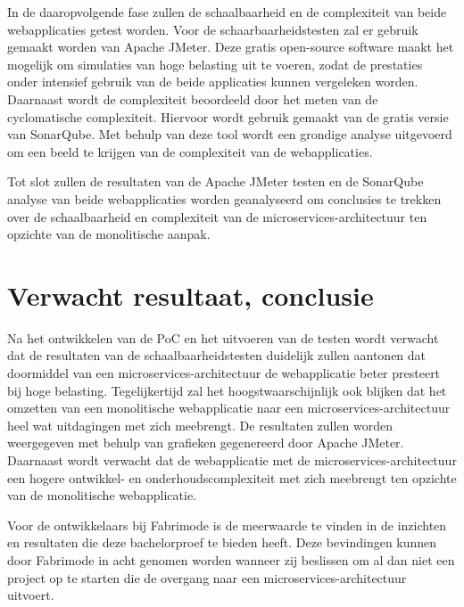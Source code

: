 In de daaropvolgende fase zullen de schaalbaarheid en de complexiteit van beide webapplicaties getest worden. Voor de schaarbaarheidstesten zal er gebruik gemaakt worden van Apache JMeter. Deze gratis open-source software maakt het mogelijk om simulaties van hoge belasting uit te voeren, zodat de prestaties onder intensief gebruik van de beide applicaties kunnen vergeleken worden. Daarnaast wordt de complexiteit beoordeeld door het meten van de cyclomatische complexiteit. Hiervoor wordt gebruik gemaakt van de gratis versie van SonarQube. Met behulp van deze tool wordt een grondige analyse uitgevoerd om een beeld te krijgen van de complexiteit van de webapplicaties.

Tot slot zullen de resultaten van de Apache JMeter testen en de SonarQube analyse van beide webapplicaties worden geanalyseerd om conclusies te trekken over de schaalbaarheid en complexiteit van de microservices-architectuur ten opzichte van de monolitische aanpak.

\section{Verwacht resultaat, conclusie}%
\label{sec:verwachte_resultaten}

Na het ontwikkelen van de PoC en het uitvoeren van de testen wordt verwacht dat de resultaten van de schaalbaarheidstesten duidelijk zullen aantonen dat doormiddel van een microservices-architectuur de webapplicatie beter presteert bij hoge belasting. Tegelijkertijd zal het hoogstwaarschijnlijk ook blijken dat het omzetten van een monolitische webapplicatie naar een microservices-architectuur heel wat uitdagingen met zich meebrengt. De resultaten zullen worden weergegeven met behulp van grafieken gegenereerd door Apache JMeter. Daarnaast wordt verwacht dat de webapplicatie met de microservices-architectuur een hogere ontwikkel- en onderhoudscomplexiteit met zich meebrengt ten opzichte van de monolitische webapplicatie.

Voor de ontwikkelaars bij Fabrimode is de meerwaarde te vinden in de inzichten en resultaten die deze bachelorproef te bieden heeft. Deze bevindingen kunnen door Fabrimode in acht genomen worden wanneer zij beslissen om al dan niet een project op te starten die de overgang naar een microservices-architectuur uitvoert.

